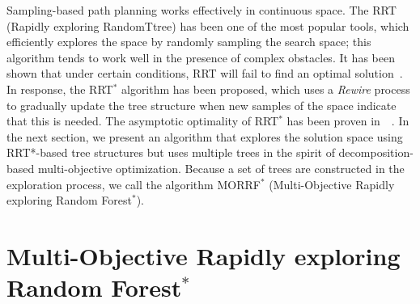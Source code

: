 \documentclass[conference]{IEEEtran}
\begin{document}
Sampling-based path planning works effectively in continuous space. The 
RRT (Rapidly exploring RandomTtree) has been one of the most popular tools, which  efficiently explores the space by randomly sampling the search space; this algorithm tends to work well in the presence of complex obstacles.
It has been shown that under certain conditions, RRT will fail to find an optimal solution~\cite{Karaman.Frazzoli:RSS10}. In response, the RRT$^{*}$ algorithm has been proposed, which uses a \emph{Rewire} process to gradually update the tree structure when new samples of the space indicate that this is needed.
The asymptotic optimality of RRT$^{*}$ has been proven in~\cite{Karaman.Frazzoli:RSS10}~\cite{Karaman:2011:SAO:2000201.2000209}. 
In the next section, we present an algorithm that explores the solution space using RRT*-based tree structures but uses multiple trees in the spirit of decomposition-based multi-objective optimization.
Because a set of trees are constructed in the exploration process, we call the algorithm MORRF$^{*}$ (Multi-Objective Rapidly exploring Random Forest$^{*}$).





\section{Multi-Objective Rapidly exploring Random Forest$^{*}$}
\label{sec:morrt}
\end{document}
